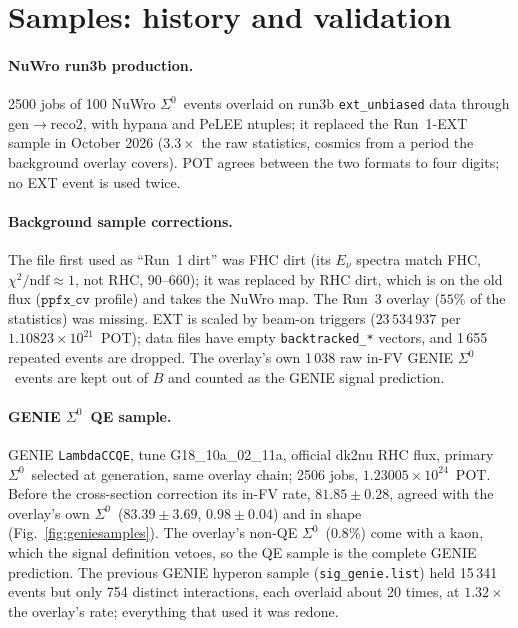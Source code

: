 \documentclass[11pt,a4paper]{article}
\newcommand{\Szero}{\ensuremath{\Sigma^{0}}}
\begin{document}
\section{Samples: history and validation}
\label{app:samples}

\paragraph{NuWro run3b production.} 2500 jobs of 100 NuWro \Szero\ events overlaid on
run3b \texttt{ext\_unbiased} data through gen$\to$reco2, with hypana and PeLEE ntuples;
it replaced the Run~1-EXT sample in October 2026 ($3.3\times$ the raw statistics, cosmics
from a period the background overlay covers). POT agrees between the two formats to four
digits; no EXT event is used twice.

\paragraph{Background sample corrections.} The file first used as ``Run~1 dirt'' was FHC
dirt (its $E_\nu$ spectra match FHC, $\chi^2/\mathrm{ndf}\approx1$, not RHC, 90--660); it
was replaced by RHC dirt, which is on the old flux ($\texttt{ppfx\_cv}$ profile) and
takes the NuWro map. The Run~3 overlay ($55\%$ of the statistics) was missing. EXT is
scaled by beam-on triggers ($23\,534\,937$ per $1.10823\times10^{21}$~POT); data files have
empty \texttt{backtracked\_*} vectors, and 1\,655 repeated events are dropped. The
overlay's own 1\,038 raw in-FV GENIE \Szero\ events are kept out of $B$ and counted as the
GENIE signal prediction.

\paragraph{GENIE \Szero\ QE sample.} GENIE \texttt{LambdaCCQE}, tune G18\_10a\_02\_11a,
official dk2nu RHC flux, primary \Szero\ selected at generation, same overlay chain;
2506 jobs, $1.23005\times10^{24}$~POT. Before the cross-section correction its in-FV
rate, $81.85\pm0.28$, agreed with the overlay's own \Szero\ ($83.39\pm3.69$, $0.98\pm0.04$)
and in shape (Fig.~\ref{fig:geniesamples}). The overlay's non-QE \Szero\ ($0.8\%$) come
with a kaon, which the signal definition vetoes, so the QE sample is the complete GENIE
prediction. The previous GENIE hyperon sample (\texttt{sig\_genie.list}) held 15\,341
events but only 754 distinct interactions, each overlaid about 20 times, at $1.32\times$ the
overlay's rate; everything that used it was redone.
\end{document}
